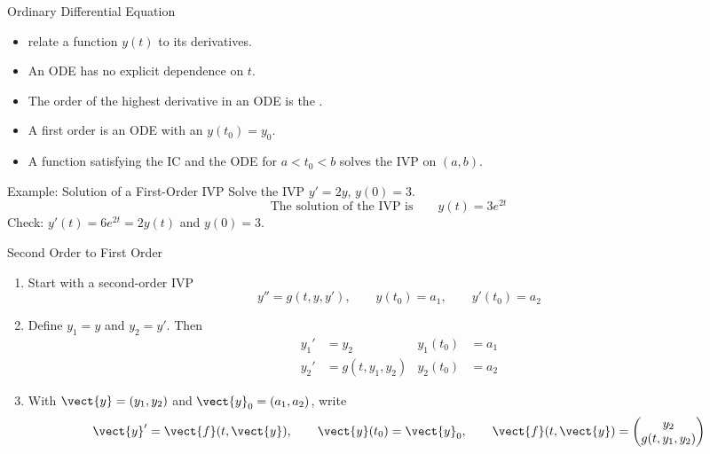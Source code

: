 \begin{frame}{Ordinary Differential Equation}
\begin{itemize}
  \item {} relate a function $y(t)$ to its derivatives.
  \item An  ODE has no explicit dependence on $t$.
  \item The order of the highest derivative in an ODE is the .
  \item A first order  is an ODE with an \newline {} $y(t_0)=y_0$.
  \item A function satisfying the IC and the 
  ODE for $a<t_0<b$ solves the IVP on $(a,b)$.
\end{itemize}
\begin{block}{Example: Solution of a First-Order IVP}
Solve the IVP $y'=2y$, $y(0)=3$.
\[
  \text{The solution of the IVP is}\qquad \boxed{y(t)=3e^{2t}}
\]
Check: $y'(t)=6e^{2t}=2y(t)$ and $y(0)=3$.
\end{block}
\end{frame}

\begin{frame}{Second Order to First Order}
\begin{enumerate}
  \item Start with a second-order IVP
  \[
    y''=g(t,y,y'),\qquad y(t_0)=a_1,\qquad y'(t_0)=a_2
  \]
  \item Define $y_1=y$ and $y_2=y'$. Then
  \[
    \begin{aligned}
      y_1'&=y_2 & y_1(t_0)&=a_1 \\
      y_2'&=g(t,y_1,y_2) & y_2(t_0)&=a_2
    \end{aligned}
  \]
  \item With $\vect{y}=(y_1,y_2)$ and $\vect{y}_0=(a_1,a_2)$, write
  \[
    \vect{y}'=\vect{f}(t,\vect{y}),\qquad
    \vect{y}(t_0)=\vect{y}_0,\qquad
    \vect{f}(t,\vect{y})=\begin{pmatrix}y_2\\g(t,y_1,y_2)\end{pmatrix}
  \]
\end{enumerate}
\end{frame}

